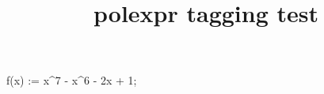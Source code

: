 \documentclass{article}
\title{polexpr tagging test}
\begin{document}
\poldef f(x) := x^7 - x^6 - 2x + 1;

\end{document}
